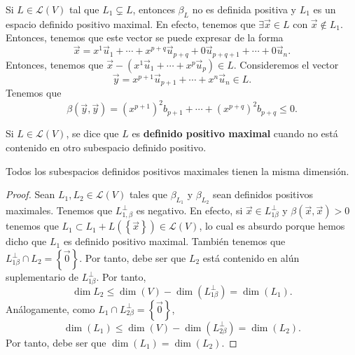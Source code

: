 \begin{observation}
\normalfont Si $\displaystyle L \in \mathcal{L}\left(V\right) $ tal que $\displaystyle L_{1} \subsetneq L $, entonces $\displaystyle \beta_{L} $ no es definida positiva y $\displaystyle L_{1} $ es un espacio definido positivo maximal. En efecto, tenemos que $\displaystyle \exists \vec{x} \in L $ con $\displaystyle \vec{x} \not\in L_{1} $. Entonces, tenemos que este vector se puede expresar de la forma
\[\vec{x} = x^{1}\vec{u}_{1} + \cdots + x^{p + q}\vec{u}_{p + q} + 0 \vec{u}_{p + q +1} + \cdots + 0\vec{u}_{n} .\]
Entonces, tenemos que $\displaystyle \vec{x}-\left(x^{1}\vec{u}_{1} + \cdots + x^{p}\vec{u}_{p}\right) \in L $. Consideremos el vector
\[ \vec{y} = x^{p +1}\vec{u}_{p +1} + \cdots + x^{n}\vec{u}_{n} \in L .\]
Tenemos que 
\[\beta\left(\vec{y},\vec{y}\right) = \left(x^{p + 1}\right)^{2}b_{p + 1} + \cdots + \left(x^{p + q}\right)^{2}b_{p + q} \leq 0 .\]
\end{observation}
\begin{fdefinition}[]
\normalfont Si $\displaystyle L \in \mathcal{L}\left(V\right) $, se dice que $\displaystyle L $ es \textbf{definido positivo maximal} cuando no está contenido en otro subespacio definido positivo.
\end{fdefinition}
\begin{ftheorem}[]
\normalfont Todos los subespacios definidos positivos maximales tienen la misma dimensión.
\end{ftheorem}
\begin{proof}
	Sean $\displaystyle L_{1}, L_{2} \in \mathcal{L}\left(V\right) $ tales que $\displaystyle \beta_{L_{1}} $ y $\displaystyle \beta_{L_{2}} $ sean definidos positivos maximales. Tenemos que $\displaystyle L^{\perp }_{1,\beta} $ es negativo. En efecto, si $\displaystyle \vec{x} \in L_{1\beta }^{\perp} $ y $\displaystyle \beta\left(\vec{x}, \vec{x}\right) > 0 $ tenemos que $\displaystyle L_{1} \subset L_{1} + L\left( \left\{ \vec{x}\right\} \right) \in \mathcal{L}\left(V\right) $, lo cual es absurdo porque hemos dicho que $\displaystyle L_{1} $ es definido positivo maximal. También tenemos que $\displaystyle L_{1\beta }^{\perp } \cap L_{2} = \left\{ \vec{0}\right\}  $. Por tanto, debe ser que $\displaystyle L_{2} $ está contenido en alún suplementario de $\displaystyle L^{\perp }_{1\beta} $. Por tanto,
	\[ \dim L_{2} \leq \dim\left(V\right)-\dim\left(L^{\perp }_{1\beta }\right) = \dim\left(L_{1}\right)  .\]
	Análogamente, como $\displaystyle L_{1} \cap L^{\perp }_{2\beta } = \left\{ \vec{0}\right\}  $,
	\[ \dim\left(L_{1}\right) \leq \dim\left(V\right) - \dim\left(L^{\perp }_{2\beta }\right) = \dim\left(L_{2}\right) .\]
Por tanto, debe ser que $\displaystyle \dim\left(L_{1}\right) = \dim\left(L_{2}\right) $.
\end{proof}
